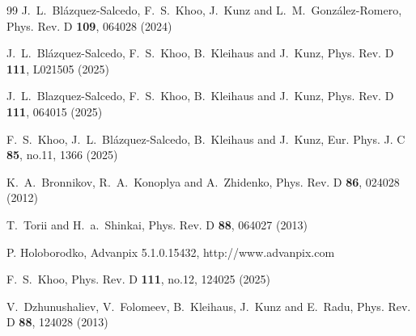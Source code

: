 \documentclass[11pt,a4paper]{article}
\begin{document}
\begin{thebibliography}{99}
J.~L.~Bl\'azquez-Salcedo, F.~S.~Khoo, J.~Kunz and L.~M.~Gonz\'alez-Romero,
Phys. Rev. D \textbf{109}, 064028 (2024)

J.~L.~Bl{\'a}zquez-Salcedo, F.~S.~Khoo, B.~Kleihaus and J.~Kunz,
Phys. Rev. D \textbf{111}, L021505 (2025)

J.~L.~Blazquez-Salcedo, F.~S.~Khoo, B.~Kleihaus and J.~Kunz,
Phys. Rev. D \textbf{111}, 064015 (2025)

F.~S.~Khoo, J.~L.~Bl{\'a}zquez-Salcedo, B.~Kleihaus and J.~Kunz,
Eur. Phys. J. C \textbf{85}, no.11, 1366 (2025)

K.~A.~Bronnikov, R.~A.~Konoplya and A.~Zhidenko,
Phys. Rev. D \textbf{86}, 024028 (2012)

T.~Torii and H.~a.~Shinkai,
Phys. Rev. D \textbf{88}, 064027 (2013)

P. Holoborodko, 
Advanpix 5.1.0.15432,
http://www.advanpix.com

F.~S.~Khoo,
Phys. Rev. D \textbf{111}, no.12, 124025 (2025)


V.~Dzhunushaliev, V.~Folomeev, B.~Kleihaus, J.~Kunz and E.~Radu,
Phys. Rev. D \textbf{88}, 124028 (2013)


\end{thebibliography}
\end{document}
